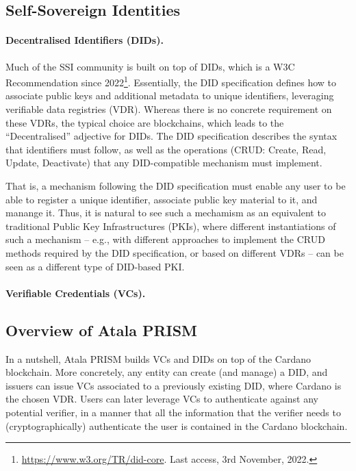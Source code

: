 \subsection{Self-Sovereign Identities}
\label{ssec:ssi}

\paragraph{Decentralised Identifiers (DIDs).} %
Much of the SSI community is built on top of DIDs, which is a W3C Recommendation
since 2022\footnote{\url{https://www.w3.org/TR/did-core}. Last access, 3rd
  November, 2022.}. Essentially, the DID specification defines how to associate
public keys and additional metadata to unique identifiers, leveraging verifiable
data registries (VDR). Whereas there is no concrete requirement on these VDRs,
the typical choice are blockchains, which leads to the ``Decentralised''
adjective for DIDs. The DID specification describes the syntax that identifiers
must follow, as well as the operations (CRUD: Create, Read, Update, Deactivate)
that any DID-compatible mechanism must implement.

That is, a mechanism following the DID specification must enable any user to be
able to register a unique identifier, associate public key material to it, and
manange it. Thus, it is natural to see such a mechamism as an equivalent to
traditional Public Key Infrastructures (PKIs), where different instantiations of
such a mechanism -- e.g., with different approaches to implement the CRUD
methods required by the DID specification, or based on different VDRs -- can be
seen as a different type of DID-based PKI.


\paragraph{Verifiable Credentials (VCs).} %

\subsection{Overview of Atala PRISM}
\label{ssec:overview-prism}

In a nutshell, Atala PRISM builds VCs and DIDs on top of the Cardano blockchain.
More concretely, any entity can create (and manage) a DID, and issuers can issue
VCs associated to a previously existing DID, where Cardano is the chosen VDR.
Users can later leverage VCs to authenticate against any potential verifier, in
a manner that all the information that the verifier needs to (cryptographically)
authenticate the user is contained in the Cardano blockchain.



